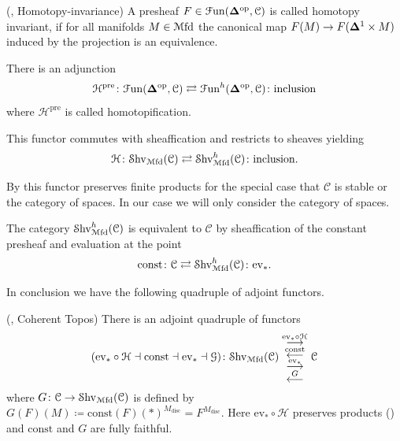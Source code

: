 \documentclass[10pt]{amsart}
\begin{document}
\begin{remark}
  (\cite[Def. 2.3.]{bunkenikolausvoelkl2016diffcoh},
  Homotopy-invariance)
  A presheaf $F \in \mathcal{F}\mathrm{un}(\bm{\Delta}^\mathrm{op}, \mathcal{C})$ is called
  homotopy invariant, if for all manifolds $M\in \mathcal{M}\mathrm{fd}$ the canonical map
  $F(M)\rightarrow F(\bm{\Delta}^1\times M)$ induced by the projection is an
  equivalence.

  There is an adjunction
  \begin{align*}
    \mathcal{H}^{\mathrm{pre}} \colon \mathcal{F}\mathrm{un}(\bm{\Delta}^\mathrm{op},
    \mathcal{C}) \rightleftarrows \mathcal{F}\mathrm{un}^h(\bm{\Delta}^\mathrm{op},
    \mathcal{C}) \colon \mathrm{inclusion}
  \end{align*}
  where $\mathcal{H}^{\mathrm{pre}}$ is called homotopification.

  This functor commutes with sheaffication and restricts to sheaves
  yielding
  \begin{align*}
    \mathcal{H} \colon \mathcal{S}\mathrm{hv}_{\mathcal{M}\mathrm{fd}}(\mathcal{C})
    \rightleftarrows \mathcal{S}\mathrm{hv}_{\mathcal{M}\mathrm{fd}}^h(\mathcal{C}) \colon \mathrm{inclusion}.
  \end{align*}
\end{remark}

By \cite[Prop. 2.6.]{bunkenikolausvoelkl2016diffcoh} this functor
preserves finite products for the special case that $\mathcal{C}$ is
stable or the category of spaces. In our case we will only consider
the category of spaces.

The category $\mathcal{S}\mathrm{hv}_{\mathcal{M}\mathrm{fd}}^h(\mathcal{C}) $ is equivalent to
$\mathcal{C}$ by sheaffication of the constant presheaf and evaluation
at the point
\begin{align*}
   \mathrm{const} \colon \mathcal{C}
    \rightleftarrows \mathcal{S}\mathrm{hv}_{\mathcal{M}\mathrm{fd}}^h(\mathcal{C}) \colon \mathrm{ev}_{\ast}.
\end{align*}

In conclusion we have the following quadruple of adjoint functors.

\begin{remark}
  (\cite[Rmk. 2.7.]{bunkenikolausvoelkl2016diffcoh},
  Coherent Topos)
  There is an adjoint quadruple of functors
  \begin{align*}
    (\mathrm{ev}_\ast \circ \mathcal{H} \dashv \mathrm{const} \dashv \mathrm{ev}_*
    \dashv \mathcal{G}) \colon \mathcal{S}\mathrm{hv}_{\mathcal{M}\mathrm{fd}}(\mathcal{C})
    \mathrel{\substack{
    \textstyle\overset{\mathrm{ev}_\ast \circ \mathcal{H}}\longrightarrow\\[-0.2ex]
    \textstyle\overset{\mathrm{const}}\longleftarrow \\[-0.2ex]
    \textstyle\overset{\mathrm{ev}_\ast}\longrightarrow \\[-0.2ex]
    \textstyle\overset{G}\longleftarrow}
    }
    \mathcal{C}
  \end{align*}
  where $ G \colon  \mathcal{C}
  \rightarrow \mathcal{S}\mathrm{hv}_{\mathcal{M}\mathrm{fd}}(\mathcal{C}) $ is defined by $G(F)(M) \coloneqq
  \mathrm{const}(F)(\ast)^{M_\mathrm{disc}} = F^{M_\mathrm{disc} }$. Here $\mathrm{ev}_\ast \circ \mathcal{H}$
  preserves products
  (\cite[Prop. 2.6.]{bunkenikolausvoelkl2016diffcoh}) and $\mathrm{const}$ and
  $G$ are fully faithful.
\end{remark}
\end{document}

